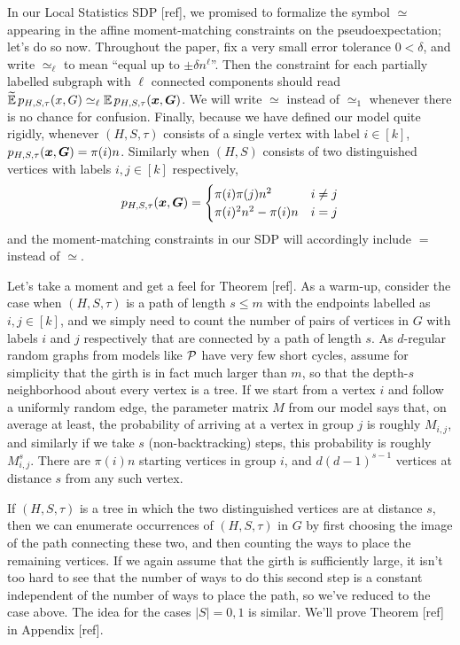 \begin{remark}
    In our Local Statistics SDP [ref], we promised to formalize the symbol $\simeq$ appearing in the affine moment-matching constraints on the pseudoexpectation; let's do so now. Throughout the paper, fix a very small error tolerance $0 < \delta$, and write $\simeq_\ell$ to mean ``equal up to $\pm \delta n^\ell$''. Then the constraint for each partially labelled subgraph with $\ell$ connected components should read $\widetilde{\operatorname*{\mathbb{E}}}\, p_{H,S,\tau}(x,G) \simeq_\ell \operatorname*{\mathbb{E}} p_{H,S,\tau}({\boldsymbol{x}},\boldsymbol{G})$. We will write $\simeq$ instead of $\simeq_1$ whenever there is no chance for confusion. Finally, because we have defined our model quite rigidly, whenever $(H,S,\tau)$ consists of a single vertex with label $i\in [k]$, $p_{H,S,\tau}({\boldsymbol{x}},\boldsymbol{G}) = \pi(i)n$. Similarly when $(H,S)$ consists of two distinguished vertices with labels $i,j\in[k]$ respectively, $$
        p_{H,S,\tau}({\boldsymbol{x}},\boldsymbol{G}) = \begin{cases} \pi(i)\pi(j)n^2 &i\neq j \\
        \pi(i)^2n^2 - \pi(i)n &i=j \end{cases}
    $$
    and the moment-matching constraints in our SDP will accordingly include $=$ instead of $\simeq$.
\end{remark}

Let's take a moment and get a feel for Theorem [ref]. As a warm-up, consider the case when $(H,S,\tau)$ is a path of length $s \le m$ with the endpoints labelled as $i,j\in [k]$, and we simply need to count the number of pairs of vertices in $G$ with labels $i$ and $j$ respectively that are connected by a path of length $s$. As $d$-regular random graphs from models like $\mathcal{P}$ have very few short cycles, assume for simplicity that the girth is in fact much larger than $m$, so that the depth-$s$ neighborhood about every vertex is a tree. If we start from a vertex $i$ and follow a uniformly random edge, the parameter matrix $M$ from our model says that, on average at least, the probability of arriving at a vertex in group $j$ is roughly $M_{i,j}$, and similarly if we take $s$ (non-backtracking) steps, this probability is roughly $M^s_{i,j}$. There are $\pi(i) n$ starting vertices in group $i$, and $d(d-1)^{s-1}$ vertices at distance $s$ from any such vertex. 

If $(H,S,\tau)$ is a tree in which the two distinguished vertices are at distance $s$, then we can enumerate occurrences of $(H,S,\tau)$ in $G$ by first choosing the image of the path connecting these two, and then counting the ways to place the remaining vertices. If we again assume that the girth is sufficiently large, it isn't too hard to see that the number of ways to do this second step is a constant independent of the number of ways to place the path, so we've reduced to the case above. The idea for the cases $|S| = 0,1$ is similar. We'll prove Theorem [ref] in Appendix [ref].


